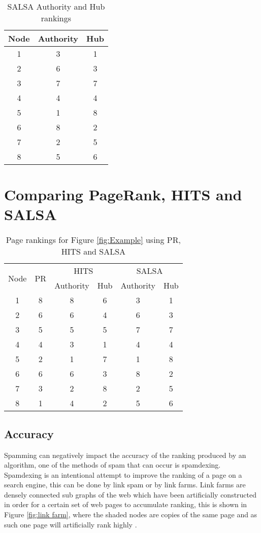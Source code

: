 \documentclass[11pt]{report}
\begin{document}
\begin{table}[H] \caption{SALSA Authority and Hub rankings}
 \centering
 \begin{tabular} {c| c c} 
 Node & Authority & Hub \\ [0.5ex] 
 \hline
 1&3&1\\
 2&6&3\\
 3&7&7\\
 4&4&4\\
 5&1&8\\
 6&8&2\\
 7&2&5\\
 8&5&6\\
 \end{tabular}
 \label{tble:SALSA}
\end{table}

\section{Comparing PageRank, HITS and SALSA} \label{sec:compare}
\begin{table}[H] \caption{Page rankings for Figure \ref{fig:Example} using PR, HITS and SALSA }
 \centering
 \begin{tabular} {c| c| c| c| c| c} 
 \multirow{2}{*}{Node} & \multirow{2}{*}{PR} & \multicolumn{2}{|c|}{HITS} & \multicolumn{2}{|c}{SALSA} \\ [0.5ex] 
 {}&{}&Authority & Hub & Authority & Hub\\ 
 \hline
 1&8&8&6&3&1\\
 2&6&6&4&6&3\\
 3&5&5&5&7&7\\
 4&4&3&1&4&4\\
 5&2&1&7&1&8\\
 6&6&6&3&8&2\\
 7&3&2&8&2&5\\
 8&1&4&2&5&6\\
 \end{tabular}
 \label{tble: comparison}
\end{table}
\subsection*{Accuracy}

Spamming can negatively impact the accuracy of the ranking produced by an algorithm, one of the methods of spam that can occur is spamdexing. Spamdexing is an intentional attempt to improve the ranking of a page on a search engine, this can be done by link spam or by link farms. Link farms are densely connected sub graphs of the web which have been artificially constructed in order for a certain set of web pages to accumulate ranking, this is shown in Figure \ref{fig:link farm}, where the shaded nodes are copies of the same page and as such one page will artificially rank highly \cite{baldi2003modeling}. 
\end{document}
